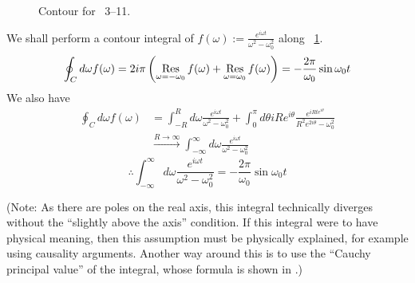 \item

\begin{figure}[ht]
	\centering
	\caption{Contour for ~3--11.}%
	\label{fig:problem3-11}
\end{figure}

We shall perform a contour integral of $f(\omega) := \frac{e^{i\omega t}}{\omega^2 - \omega_0^2}$ along ~\ref{fig:problem3-11}.
\[
	\oint_C d\omega f(\omega)
	= 2i\pi \left( \mathop{\mathrm{Res}}_{\omega = -\omega_0} f(\omega) + \mathop{\mathrm{Res}}_{\omega = \omega_0} f(\omega) \right)
	= -\frac{2\pi}{\omega_0} \sin \omega_0 t
\]
We also have
\begin{align*}
	\oint_C d\omega f(\omega)
	 & = \int_{-R}^R d\omega \frac{e^{i\omega t}}{\omega^2 - \omega_0^2}
	+ \int_0^\pi d\theta iRe^{i\theta} \frac{e^{iRte^{i\theta}}}{R^2 e^{2i\theta} - \omega_0^2}                     \\
	 & \xrightarrow{R \rightarrow \infty} \int_{-\infty}^\infty d\omega \frac{e^{i\omega t}}{\omega^2 - \omega_0^2}
\end{align*}
\[
	\therefore \int_{-\infty}^{\infty} d\omega \frac{e^{i\omega t}}{\omega^2 - \omega_0^2}
	= -\frac{2\pi}{\omega_0} \sin \omega_0 t
\]

(Note: As there are poles on the real axis, this integral technically diverges without the ``slightly above the axis'' condition.
If this integral were to have physical meaning, then this assumption must be physically explained, for example using causality arguments.
Another way around this is to use the ``Cauchy principal value'' of the integral, whose formula is shown in .)